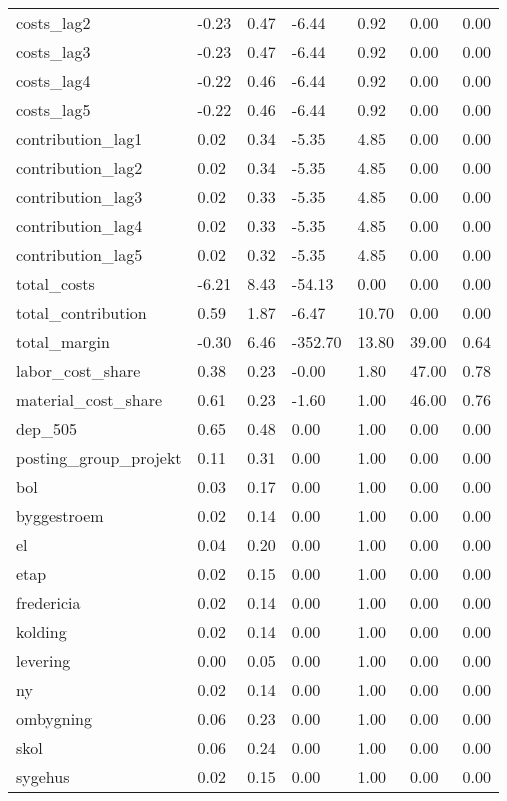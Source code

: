 \begin{landscape}
\begin{longtable}[h!]{lllllll}
costs_lag2 & -0.23 & 0.47 & -6.44 & 0.92 & 0.00 & 0.00 \\
costs_lag3 & -0.23 & 0.47 & -6.44 & 0.92 & 0.00 & 0.00 \\
costs_lag4 & -0.22 & 0.46 & -6.44 & 0.92 & 0.00 & 0.00 \\
costs_lag5 & -0.22 & 0.46 & -6.44 & 0.92 & 0.00 & 0.00 \\
contribution_lag1 & 0.02 & 0.34 & -5.35 & 4.85 & 0.00 & 0.00 \\
contribution_lag2 & 0.02 & 0.34 & -5.35 & 4.85 & 0.00 & 0.00 \\
contribution_lag3 & 0.02 & 0.33 & -5.35 & 4.85 & 0.00 & 0.00 \\
contribution_lag4 & 0.02 & 0.33 & -5.35 & 4.85 & 0.00 & 0.00 \\
contribution_lag5 & 0.02 & 0.32 & -5.35 & 4.85 & 0.00 & 0.00 \\
total_costs & -6.21 & 8.43 & -54.13 & 0.00 & 0.00 & 0.00 \\
total_contribution & 0.59 & 1.87 & -6.47 & 10.70 & 0.00 & 0.00 \\
total_margin & -0.30 & 6.46 & -352.70 & 13.80 & 39.00 & 0.64 \\
labor_cost_share & 0.38 & 0.23 & -0.00 & 1.80 & 47.00 & 0.78 \\
material_cost_share & 0.61 & 0.23 & -1.60 & 1.00 & 46.00 & 0.76 \\
dep_505 & 0.65 & 0.48 & 0.00 & 1.00 & 0.00 & 0.00 \\
posting_group_projekt & 0.11 & 0.31 & 0.00 & 1.00 & 0.00 & 0.00 \\
bol & 0.03 & 0.17 & 0.00 & 1.00 & 0.00 & 0.00 \\
byggestroem & 0.02 & 0.14 & 0.00 & 1.00 & 0.00 & 0.00 \\
el & 0.04 & 0.20 & 0.00 & 1.00 & 0.00 & 0.00 \\
etap & 0.02 & 0.15 & 0.00 & 1.00 & 0.00 & 0.00 \\
fredericia & 0.02 & 0.14 & 0.00 & 1.00 & 0.00 & 0.00 \\
kolding & 0.02 & 0.14 & 0.00 & 1.00 & 0.00 & 0.00 \\
levering & 0.00 & 0.05 & 0.00 & 1.00 & 0.00 & 0.00 \\
ny & 0.02 & 0.14 & 0.00 & 1.00 & 0.00 & 0.00 \\
ombygning & 0.06 & 0.23 & 0.00 & 1.00 & 0.00 & 0.00 \\
skol & 0.06 & 0.24 & 0.00 & 1.00 & 0.00 & 0.00 \\
sygehus & 0.02 & 0.15 & 0.00 & 1.00 & 0.00 & 0.00 \\

\end{longtable}
\end{landscape}
